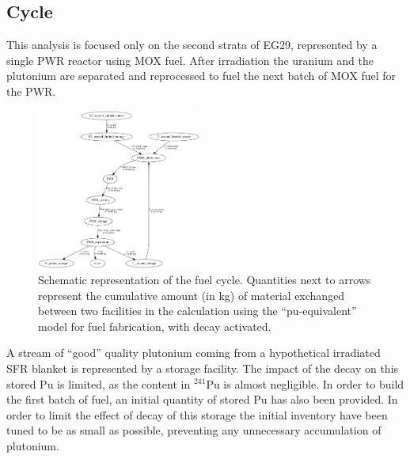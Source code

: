 \documentclass{anstrans}
\begin{document}
\subsection{Cycle}
This analysis is focused only on the second strata of EG29, represented by a single
PWR reactor using MOX fuel. After irradiation the uranium and the plutonium are
separated and reprocessed to fuel the next batch of MOX fuel for the PWR.

\begin{figure}[ht] %
  \centering
  \includegraphics[width=0.48\textwidth]{flow}
  \caption{Schematic representation of the fuel cycle. Quantities next to arrows
  represent the cumulative amount (in kg) of material exchanged between two
facilities in the calculation using the ``pu-equivalent'' model for fuel fabrication, with decay activated.}
  \label{fig:flow}
\end{figure}

A stream of ``good'' quality plutonium coming from a hypothetical irradiated
SFR blanket is represented by a storage facility. 
The impact of the decay on this stored Pu
is limited, as the content in $^{241}$Pu is almost negligible.  In order to
build the first batch of fuel, an initial quantity of stored Pu has also been provided.
In order to limit the effect of decay of this storage the initial inventory have been
tuned to be as small as possible, preventing any unnecessary accumulation of plutonium.
\end{document}
